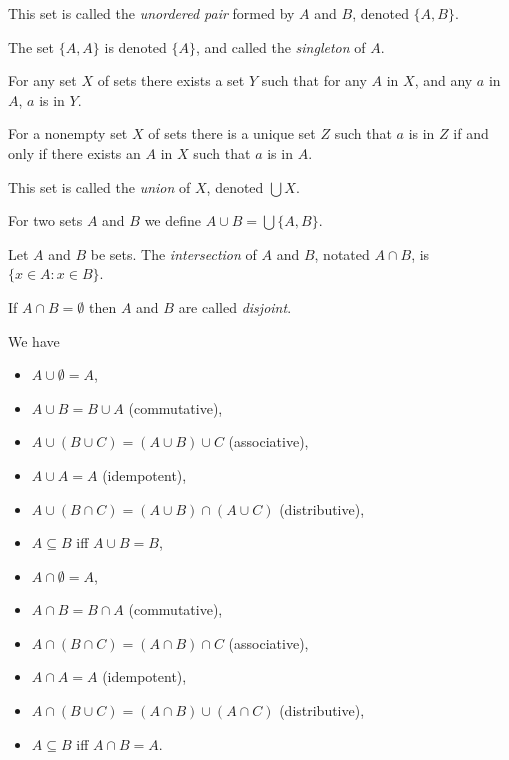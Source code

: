 \begin{defn}
  This set is called the \emph{unordered pair} formed by $A$ and $B$, denoted
  $\{A,B\}$.
\end{defn}
\begin{defn}
  The set $\{A,A\}$ is denoted $\{A\}$, and called the \emph{singleton} of
  $A$.
\end{defn}
\begin{axiom}[Union]
  For any set $X$ of sets there exists a set $Y$ such that for any $A$ in $X$,
  and any $a$ in $A$, $a$ is in $Y$.
\end{axiom}
\begin{prop}
  For a nonempty set $X$ of sets there is a unique set $Z$ such that $a$ is in $Z$ if and
  only if there exists an $A$ in $X$ such that $a$ is in $A$.
\end{prop}
\begin{defn}
  This set is called the \emph{union} of $X$, denoted
  $\bigcup X$.

  For two sets $A$ and $B$ we define $A\cup B=\bigcup \{A,B\}$.
\end{defn}
\begin{defn}
  Let $A$ and $B$ be sets.
  The \emph{intersection} of $A$ and $B$, notated $A\cap B$, is $\{x\in A:x\in
    B\}$.

  If $A\cap B=\emptyset$ then $A$ and $B$ are called \emph{disjoint}.
\end{defn}
\begin{prop}
  We have
  \begin{itemize}
    \item $A\cup\emptyset=A$,
    \item $A\cup B=B\cup A$ (commutative),
    \item $A\cup (B\cup C)=(A\cup B)\cup C$ (associative),
    \item $A\cup A=A$ (idempotent),
    \item $A\cup (B\cap C)=(A\cup B)\cap(A\cup C)$ (distributive),
    \item $A\subseteq B$ iff $A\cup B=B$,
    \item $A\cap\emptyset=A$,
    \item $A\cap B=B\cap A$ (commutative),
    \item $A\cap (B\cap C)=(A\cap B)\cap C$ (associative),
    \item $A\cap A=A$ (idempotent),
    \item $A\cap (B\cup C)=(A\cap B)\cup(A\cap C)$ (distributive),
    \item $A\subseteq B$ iff $A\cap B=A$.
  \end{itemize}
\end{prop}
